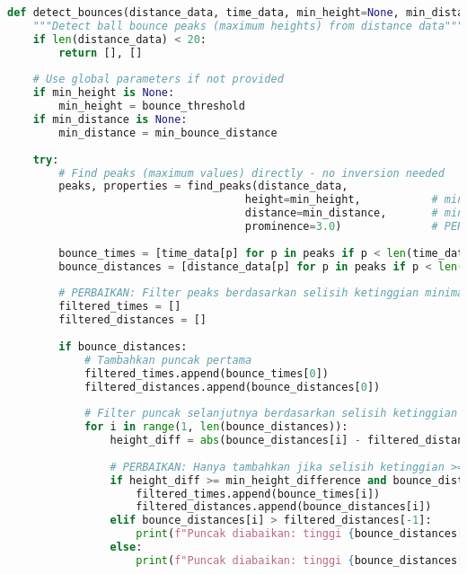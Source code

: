 \begin{itemize}
\begin{scriptsize}
\begin{lstlisting}[language=python]
def detect_bounces(distance_data, time_data, min_height=None, min_distance=None):
    """Detect ball bounce peaks (maximum heights) from distance data"""
    if len(distance_data) < 20:
        return [], []
    
    # Use global parameters if not provided
    if min_height is None:
        min_height = bounce_threshold
    if min_distance is None:
        min_distance = min_bounce_distance
    
    try:
        # Find peaks (maximum values) directly - no inversion needed
        peaks, properties = find_peaks(distance_data, 
                                     height=min_height,           # minimum peak height
                                     distance=min_distance,       # minimum distance between peaks
                                     prominence=3.0)              # PERBAIKAN: tingkatkan prominence dari 2.0 ke 3.0
        
        bounce_times = [time_data[p] for p in peaks if p < len(time_data)]
        bounce_distances = [distance_data[p] for p in peaks if p < len(distance_data)]
        
        # PERBAIKAN: Filter peaks berdasarkan selisih ketinggian minimal 1 cm dan trend menurun
        filtered_times = []
        filtered_distances = []
        
        if bounce_distances:
            # Tambahkan puncak pertama
            filtered_times.append(bounce_times[0])
            filtered_distances.append(bounce_distances[0])
            
            # Filter puncak selanjutnya berdasarkan selisih ketinggian dan trend menurun
            for i in range(1, len(bounce_distances)):
                height_diff = abs(bounce_distances[i] - filtered_distances[-1])
                
                # PERBAIKAN: Hanya tambahkan jika selisih ketinggian >= 1 cm DAN tinggi menurun (untuk pantulan alami)
                if height_diff >= min_height_difference and bounce_distances[i] <= filtered_distances[-1]:
                    filtered_times.append(bounce_times[i])
                    filtered_distances.append(bounce_distances[i])
                elif bounce_distances[i] > filtered_distances[-1]:
                    print(f"Puncak diabaikan: tinggi {bounce_distances[i]:.1f}cm > puncak sebelum {filtered_distances[-1]:.1f}cm (trend naik tidak wajar)")
                else:
                    print(f"Puncak diabaikan: tinggi {bounce_distances[i]:.1f}cm, selisih {height_diff:.1f}cm < {min_height_difference}cm")
        

\end{lstlisting}
\end{scriptsize}
\end{itemize}
